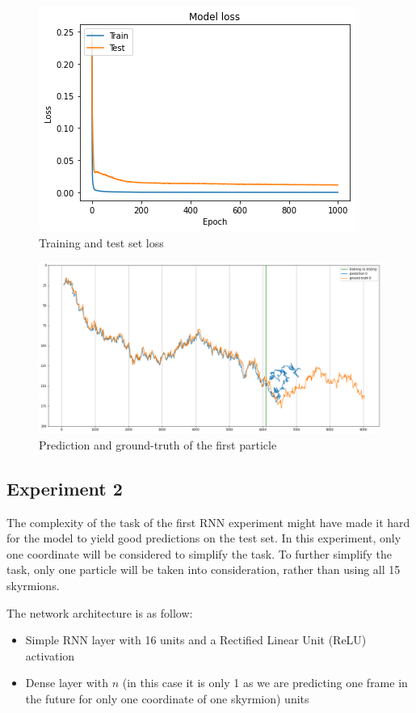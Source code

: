 \documentclass[a4paper]{article}
\begin{document}
  \begin{figure}
    \centering
    \includegraphics[scale=0.8]{rnn1_loss.png}
    \caption{Training and test set loss}
    \label{fig:rnn1_loss}
  \end{figure}

  \begin{figure}
    \centering
    \includegraphics[width=\textwidth]{rnn1_plot.png}
    \caption{Prediction and ground-truth of the first particle}
    \label{fig:rnn1_plot}
  \end{figure}

  \subsection{Experiment 2}
  The complexity of the task of the first RNN experiment might have made it hard for the model to yield good predictions on the test set. In this experiment, only one coordinate will be considered to simplify the task. To further simplify the task, only one particle will be taken into consideration, rather than using all 15 skyrmions.

  The network architecture is as follow:

  \begin{itemize}
    \item Simple RNN layer with 16 units and a Rectified Linear Unit (ReLU) activation
    \item Dense layer with $n$ (in this case it is only 1 as we are predicting one frame in the future for only one coordinate of one skyrmion) units
  \end{itemize}
\end{document}
